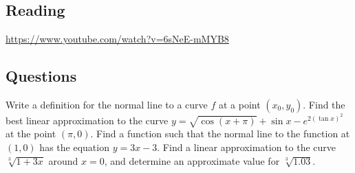 


\subsection*{Reading}
\begin{center}
\begin{tcolorbox}[width=0.8\textwidth,colback={red},title={\textbf{Go and watch...}},colbacktitle=yellow,coltitle=blue]
  \textcolor{white}{\url{https://www.youtube.com/watch?v=6sNeE-mMYB8}}
\end{tcolorbox}
\end{center}

\subsection*{Questions}
\begin{questions}
  \question Write a definition for the normal line to a curve $ f $ at a point $ (x_0, y_0) $.
  \question Find the best linear approximation to the curve $ y = \sqrt{\cos(x + \pi)} + \sin x - e^{2(\tan x)^2} $ at the point $ (\pi, 0) $.
  \question Find a function such that the normal line to the function at $ (1,0) $ has the equation $ y = 3x - 3 $.
  \question Find a linear approximation to the curve $ \sqrt[3]{1 + 3x} $ around $ x = 0 $, and determine an approximate value for $ \sqrt[3]{1.03} $.
\end{questions}

